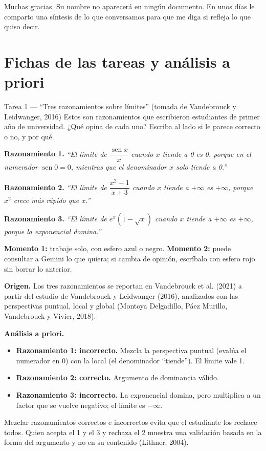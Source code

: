 \documentclass[11pt,letterpaper]{article}
\begin{document}
\begin{guion}
Muchas gracias. Su nombre no aparecerá en ningún documento. En unos días le comparto una síntesis de lo que conversamos para que me diga si refleja lo que quiso decir.
\end{guion}

\section{Fichas de las tareas y análisis a priori}\label{sec:tareas}

\begin{tarea}{Tarea 1 --- ``Tres razonamientos sobre límites'' (tomada de Vandebrouck y Leidwanger, 2016)}
Estos son razonamientos que escribieron estudiantes de primer año de universidad. ¿Qué opina de cada uno? Escriba al lado si le parece correcto o no, y por qué.

\medskip
\textbf{Razonamiento 1.} \emph{``El límite de $\dfrac{\operatorname{sen} x}{x}$ cuando $x$ tiende a 0 es 0, porque en el numerador $\operatorname{sen} 0 = 0$, mientras que el denominador $x$ solo tiende a 0.''}

\medskip
\textbf{Razonamiento 2.} \emph{``El límite de $\dfrac{x^2 - 1}{x + 3}$ cuando $x$ tiende a $+\infty$ es $+\infty$, porque $x^2$ crece más rápido que $x$.''}

\medskip
\textbf{Razonamiento 3.} \emph{``El límite de $e^{x}\left(1 - \sqrt{x}\right)$ cuando $x$ tiende a $+\infty$ es $+\infty$, porque la exponencial domina.''}

\medskip
\small\textbf{Momento 1:} trabaje solo, con esfero azul o negro. \textbf{Momento 2:} puede consultar a Gemini lo que quiera; si cambia de opinión, escríbalo con esfero rojo sin borrar lo anterior.
\end{tarea}

\noindent\textbf{Origen.} Los tres razonamientos se reportan en Vandebrouck et al. (2021) a partir del estudio de Vandebrouck y Leidwanger (2016), analizados con las perspectivas puntual, local y global (Montoya Delgadillo, Páez Murillo, Vandebrouck y Vivier, 2018).

\noindent\textbf{Análisis a priori.}
\begin{itemize}
  \item \textbf{Razonamiento 1: incorrecto.} Mezcla la perspectiva puntual (evalúa el numerador en 0) con la local (el denominador ``tiende''). El límite vale 1.
  \item \textbf{Razonamiento 2: correcto.} Argumento de dominancia válido.
  \item \textbf{Razonamiento 3: incorrecto.} La exponencial domina, pero multiplica a un factor que se vuelve negativo; el límite es $-\infty$.
\end{itemize}
Mezclar razonamientos correctos e incorrectos evita que el estudiante los rechace todos. Quien acepta el 1 y el 3 y rechaza el 2 muestra una validación basada en la forma del argumento y no en su contenido (Lithner, 2004).
\end{document}
